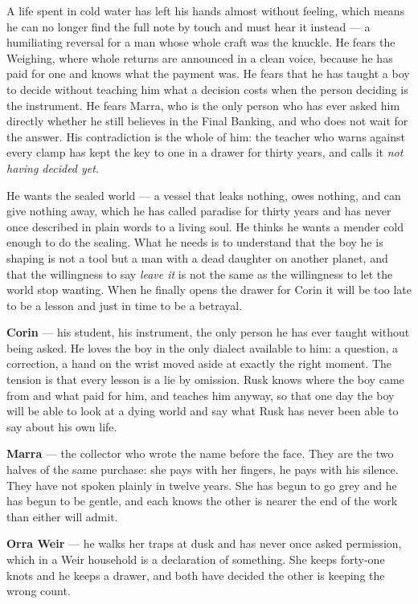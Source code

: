 \documentclass{design/chronicle}
\begin{document}
{
A life spent in cold water has left his hands almost without feeling, which means he can no longer find the full note by touch and must hear it instead — a humiliating reversal for a man whose whole craft was the knuckle. He fears the Weighing, where whole returns are announced in a clean voice, because he has paid for one and knows what the payment was. He fears that he has taught a boy to decide without teaching him what a decision costs when the person deciding is the instrument. He fears Marra, who is the only person who has ever asked him directly whether he still believes in the Final Banking, and who does not wait for the answer. His contradiction is the whole of him: the teacher who warns against every clamp has kept the key to one in a drawer for thirty years, and calls it \emph{not having decided yet}.

He wants the sealed world — a vessel that leaks nothing, owes nothing, and can give nothing away, which he has called paradise for thirty years and has never once described in plain words to a living soul. He thinks he wants a mender cold enough to do the sealing. What he needs is to understand that the boy he is shaping is not a tool but a man with a dead daughter on another planet, and that the willingness to say \emph{leave it} is not the same as the willingness to let the world stop wanting. When he finally opens the drawer for Corin it will be too late to be a lesson and just in time to be a betrayal.

\textbf{Corin} — his student, his instrument, the only person he has ever taught without being asked. He loves the boy in the only dialect available to him: a question, a correction, a hand on the wrist moved aside at exactly the right moment. The tension is that every lesson is a lie by omission. Rusk knows where the boy came from and what paid for him, and teaches him anyway, so that one day the boy will be able to look at a dying world and say what Rusk has never been able to say about his own life.

\textbf{Marra} — the collector who wrote the name before the face. They are the two halves of the same purchase: she pays with her fingers, he pays with his silence. They have not spoken plainly in twelve years. She has begun to go grey and he has begun to be gentle, and each knows the other is nearer the end of the work than either will admit.

\textbf{Orra Weir} — he walks her traps at dusk and has never once asked permission, which in a Weir household is a declaration of something. She keeps forty-one knots and he keeps a drawer, and both have decided the other is keeping the wrong count.

}
\end{document}
